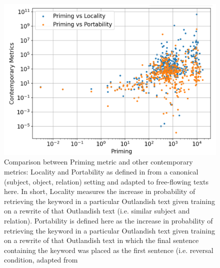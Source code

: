 \documentclass[11pt, a4paper, logo, copyright]{googledeepmind}
\theoremstyle{plain}
\theoremstyle{definition}
\theoremstyle{remark}
\begin{document}







\begin{figure}[h]
\vspace{0mm}
    \centering \includegraphics[scale=.2,clip]{figures/Reviewer_locality.png}
    \vspace{-1mm}
    \caption{Comparison between Priming metric and other contemporary metrics: Locality and Portability as defined in \cite{portability}
    from a canonical (subject, object, relation) setting and adapted to free-flowing texts here. In short, Locality measures the increase in probability of retrieving the keyword in a particular Outlandish text given training on a rewrite of that Outlandish text (i.e. similar subject and relation). Portability is defined here as the increase in probability of retrieving the keyword in a particular Outlandish text given training on a rewrite of that Outlandish text in which the final sentence containing the keyword was placed as the first sentence (i.e. reversal condition, adapted from \cite{portability} } \label{fig:Reviewer_locality}
  \vspace{-0mm}
\end{figure}
\end{document}
